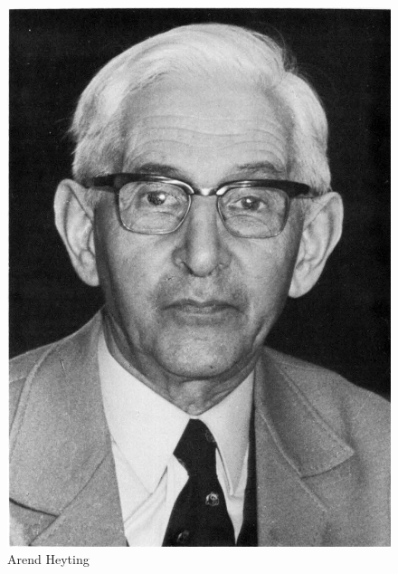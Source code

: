 \documentclass[xetex]{beamer}
\begin{document}
\begin{frame}
\begin{figure}
\begin{minipage}{.3\textwidth}
\includegraphics[width=\linewidth]{heyting}
\caption*{Arend Heyting}
\label{fig:test2}
\end{minipage}\hfill
\begin{minipage}{.3\textwidth}
\centering

\end{minipage}
\end{figure}
\end{frame}
\end{document}
